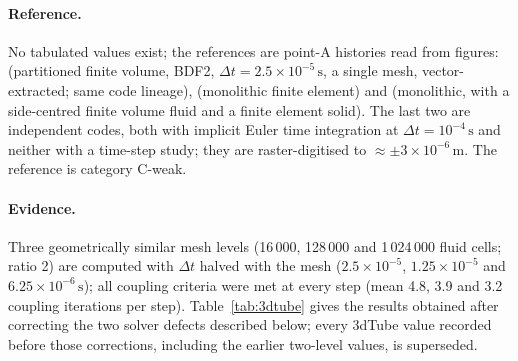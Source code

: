 \paragraph{Reference.}
No tabulated values exist; the references are point-A histories read from figures: \citet{Tukovic2018} (partitioned finite volume, BDF2, $\Delta t = 2.5\times10^{-5}\,\mathrm{s}$, a single mesh, vector-extracted; same code lineage), \citet{Lozovskiy2019} (monolithic finite element) and \citet{Eken2016} (monolithic, with a side-centred finite volume fluid and a finite element solid).
The last two are independent codes, both with implicit Euler time integration at $\Delta t = 10^{-4}\,\mathrm{s}$ and neither with a time-step study; they are raster-digitised to $\approx\pm3\times10^{-6}\,\mathrm{m}$.
The reference is category C-weak.

\paragraph{Evidence.}
Three geometrically similar mesh levels (16\,000, 128\,000 and 1\,024\,000 fluid cells; ratio 2) are computed with $\Delta t$ halved with the mesh ($2.5\times10^{-5}$, $1.25\times10^{-5}$ and $6.25\times10^{-6}\,\mathrm{s}$); all coupling criteria were met at every step (mean 4.8, 3.9 and 3.2 coupling iterations per step).
Table~\ref{tab:3dtube} gives the results obtained after correcting the two solver defects described below; every 3dTube value recorded before those corrections, including the earlier two-level values, is superseded.


